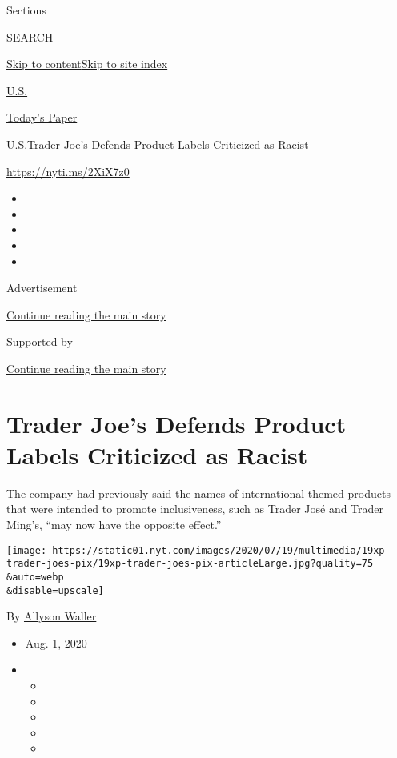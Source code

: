 Sections

SEARCH

\protect\hyperlink{site-content}{Skip to
content}\protect\hyperlink{site-index}{Skip to site index}

\href{https://www.nytimes.com/section/us}{U.S.}

\href{https://myaccount.nytimes.com/auth/login?response_type=cookie\&client_id=vi}{}

\href{https://www.nytimes.com/section/todayspaper}{Today's Paper}

\href{/section/us}{U.S.}\textbar{}Trader Joe's Defends Product Labels
Criticized as Racist

\url{https://nyti.ms/2XiX7z0}

\begin{itemize}
\item
\item
\item
\item
\item
\end{itemize}

Advertisement

\protect\hyperlink{after-top}{Continue reading the main story}

Supported by

\protect\hyperlink{after-sponsor}{Continue reading the main story}

\hypertarget{trader-joes-defends-product-labels-criticized-as-racist}{%
\section{Trader Joe's Defends Product Labels Criticized as
Racist}\label{trader-joes-defends-product-labels-criticized-as-racist}}

The company had previously said the names of international-themed
products that were intended to promote inclusiveness, such as Trader
José and Trader Ming's, ``may now have the opposite effect.''

\texttt{[image: https://static01.nyt.com/images/2020/07/19/multimedia/19xp-trader-joes-pix/19xp-trader-joes-pix-articleLarge.jpg?quality=75\\\&auto=webp\\\&disable=upscale]}

By \href{https://www.nytimes.com/by/allyson-waller}{Allyson Waller}

\begin{itemize}
\item
  Aug. 1, 2020
\item
  \begin{itemize}
  \item
  \item
  \item
  \item
  \item
  \end{itemize}
\end{itemize}

